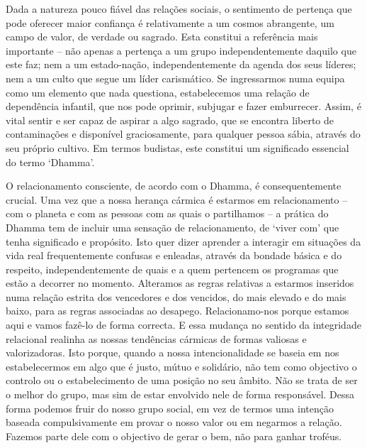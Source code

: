 Dada a natureza pouco fiável das relações sociais, o sentimento de pertença que pode oferecer maior confiança é relativamente a um cosmos abrangente, um campo de valor, de verdade ou sagrado. Esta constitui a referência mais importante -- não apenas a pertença a um grupo independentemente daquilo que este faz; nem a um estado-nação, independentemente da agenda dos seus líderes; nem a um culto que segue um líder carismático. Se ingressarmos numa equipa como um elemento que nada questiona, estabelecemos uma relação de dependência infantil, que nos pode oprimir, subjugar e fazer emburrecer. Assim, é vital sentir e ser capaz de aspirar a algo sagrado, que se encontra liberto de contaminações e disponível graciosamente, para qualquer pessoa sábia, através do seu próprio cultivo. Em termos budistas, este constitui um significado essencial do termo `Dhamma'.

O relacionamento consciente, de acordo com o Dhamma, é consequentemente crucial. Uma vez que a nossa herança cármica é estarmos em relacionamento -- com o planeta e com as pessoas com as quais o partilhamos -- a prática do Dhamma tem de incluir uma sensação de relacionamento, de `viver com' que tenha significado e propósito. Isto quer dizer aprender a interagir em situações da vida real frequentemente confusas e enleadas, através da bondade básica e do respeito, independentemente de quais e a quem pertencem os programas que estão a decorrer no momento. Alteramos as regras relativas a estarmos inseridos numa relação estrita dos vencedores e dos vencidos, do mais elevado e do mais baixo, para as regras associadas ao desapego. Relacionamo-nos porque estamos aqui e vamos fazê-lo de forma correcta. E essa mudança no sentido da integridade relacional realinha as nossas tendências cármicas de formas valiosas e valorizadoras. Isto porque, quando a nossa intencionalidade se baseia em nos estabelecermos em algo que é justo, mútuo e solidário, não tem como objectivo o controlo ou o estabelecimento de uma posição no seu âmbito. Não se trata de ser o melhor do grupo, mas sim de estar envolvido nele de forma responsável. Dessa forma podemos fruir do nosso grupo social, em vez de termos uma intenção baseada compulsivamente em provar o nosso valor ou em negarmos a relação. Fazemos parte dele com o objectivo de gerar o bem, não para ganhar troféus.

